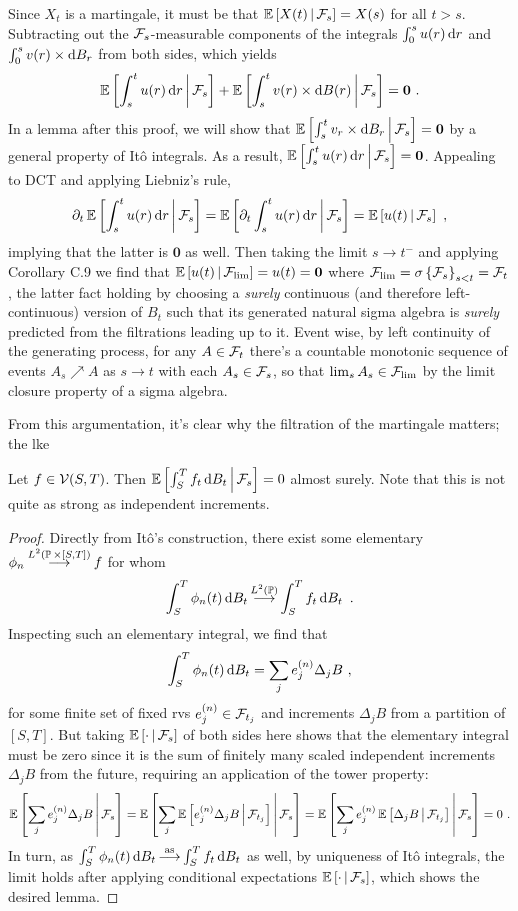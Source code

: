 \documentclass{article}
\begin{document}
    Since \(X_t\) is a martingale, it must be that \(\operatorname{\mathbb{E}}\left[ X(t) \,\middle|\, \mathcal{F}_s \right]=X(s)\) for all \(t> s\). Subtracting out the \(\mathcal{F}_s\)-measurable components of the integrals \(\int_0^su(r)\mathop{\mathrm{d} r }\) and \(\int_0^sv(r)\times \mathop{\mathrm{d} B_r }\) from both sides, which yields
    \[
\operatorname{\mathbb{E}}\left[ \int_s^tu(r)\mathop{\mathrm{d} r } \,\middle|\, \mathcal{F}_s \right]+\operatorname{\mathbb{E}}\left[ \int_s^tv(r)\times\mathop{\mathrm{d} B(r) } \,\middle|\, \mathcal{F}_s \right]=\textbf{0}\,\,.
      \]
      In a lemma after this proof, we will show that \(\operatorname{\mathbb{E}}\left[ \int_s^tv_r\times\mathop{\mathrm{d} B_r } \,\middle|\, \mathcal{F}_s \right]=\textbf{0}\) by a general property of It\^{o} integrals. As a result, \(\operatorname{\mathbb{E}}\left[ \int_s^tu(r)\mathop{\mathrm{d} r } \,\middle|\, \mathcal{F}_s \right]=\textbf{0}\). Appealing to DCT and applying Liebniz's rule,
      \[
        \partial_t\operatorname{\mathbb{E}}\left[ \int_s^tu(r)\mathop{\mathrm{d} r } \,\middle|\, \mathcal{F}_s \right]=\operatorname{\mathbb{E}}\left[ \partial_t\int_s^tu(r)\mathop{\mathrm{d} r } \,\middle|\, \mathcal{F}_s \right]=\operatorname{\mathbb{E}}\left[ u(t) \,\middle|\, \mathcal{F}_s \right]\,\,,
      \]
      implying that the latter is \(\textbf{0}\) as well. Then taking the limit \(s\rightarrow t^{-}\) and applying Corollary C.9 we find that \(\operatorname{\mathbb{E}}\left[ u(t) \,\middle|\, \mathcal{F}_{\lim} \right]=u(t)=\textbf{0}\) where \(\mathcal{F}_{\lim}=\sigma\left\{{\mathcal{F}_s}\right\}_{s<t}=\mathcal{F}_t\), the latter fact holding by choosing a {\em surely} continuous (and therefore left-continuous) version of \(B_t\) such that its generated natural sigma algebra is {\em surely} predicted from the filtrations leading up to it. Event wise, by left continuity of the generating process, for any \(A\in\mathcal{F}_t\) there's a countable monotonic sequence of events \(A_s\nearrow A\) as \(s\rightarrow t\) with each \(A_s\in\mathcal{F}_s\), so that \(\lim_s A_s\in \mathcal{F}_{\lim}\) by the limit closure property of a sigma algebra.

      From this argumentation, it's clear why the filtration of the martingale matters; the lke

      \begin{lemma}
        Let \(f\in\mathcal{V}(S, T)\). Then \(\operatorname{\mathbb{E}}\left[ \int_S^Tf_t\mathop{\mathrm{d} B_t } \,\middle|\, \mathcal{F}_s \right]=0\) almost surely. Note that this is not quite as strong as independent increments.
      \end{lemma}
      \begin{proof}
        Directly from It\^{o}'s construction, there exist some elementary \(\phi_n\mathbin{\overset{ L^2(\operatorname{\mathbb{P}}\times[S,T]) }{\longrightarrow}}f\) for whom
        \[\int_S^T\phi_n(t)\mathop{\mathrm{d} B_t }\mathbin{\overset{ L^2(\operatorname{\mathbb{P}}) }{\longrightarrow}}\int_S^Tf_t\mathop{\mathrm{d} B_t }\,\,.
        \]
        Inspecting such an elementary integral, we find that
        \[
          \int_S^T\phi_n(t)\mathop{\mathrm{d} B_t }=\sum_je_j^{(n)}\Delta_j B\,\,,
        \]
        for some finite set of fixed rvs \(e_j^{(n)}\in\mathcal{F}_{t_j}\) and increments \(\Delta_j B\) from a partition of \([S, T]\). But taking \(\operatorname{\mathbb{E}}\left[ \cdot \,\middle|\, \mathcal{F}_s \right]\) of both sides here shows that the elementary integral must be zero since it is the sum of finitely many scaled independent increments \(\Delta_jB\) from the future, requiring an application of the tower property:
        \[
          \operatorname{\mathbb{E}}\left[ \sum_je_j^{(n)}\Delta_j B \,\middle|\, \mathcal{F}_s \right]=\operatorname{\mathbb{E}}\left[ \sum_j\operatorname{\mathbb{E}}\left[ e_j^{(n)}\Delta_j B \,\middle|\, \mathcal{F}_{t_j} \right] \,\middle|\, \mathcal{F}_s \right]=\operatorname{\mathbb{E}}\left[ \sum_je_j^{(n)}\operatorname{\mathbb{E}}\left[ \Delta_j B \,\middle|\, \mathcal{F}_{t_j} \right] \,\middle|\, \mathcal{F}_s \right]=0\,\,.
          \]
        In turn, as \(\int_S^T\phi_n(t)\mathop{\mathrm{d} B_t }\mathbin{\overset{\text{as}}{\longrightarrow}}\int_S^T f_t\mathop{\mathrm{d} B_t }\) as well, by uniqueness of It\^{o} integrals, the limit holds after applying conditional expectations \(\operatorname{\mathbb{E}}\left[ \cdot \,\middle|\, \mathcal{F}_s \right]\), which shows the desired lemma.
      \end{proof}
\end{document}
